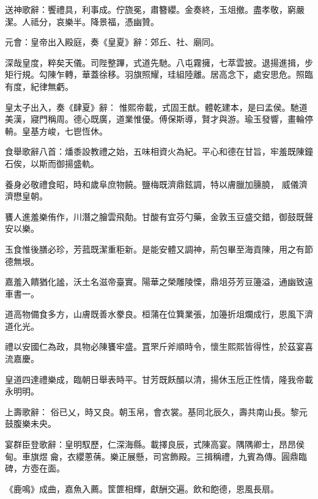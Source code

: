 \begin{pinyinscope}
 送神歌辭：饗禮具，利事成。佇旒冕，肅簪纓。金奏終，玉俎撤。盡孝敬，窮嚴潔。人祗分，哀樂半。降景福，憑幽贊。



 元會：皇帝出入殿庭，奏《皇夏》辭：郊丘、社、廟同。



 深哉皇度，粹矣天儀。司陛整蹕，式道先馳。八屯霧擁，七萃雲披。退揚進揖，步矩行規。勾陳乍轉，華蓋徐移。羽旗照耀，珪組陸離。居高念下，處安思危。照臨有度，紀律無虧。



 皇太子出入，奏《肆夏》辭：
 惟熙帝載，式固王猷。體乾建本，是曰孟侯。馳道美漢，寢門稱周。德心既廣，道業惟優。傅保斯導，賢才與游。瑜玉發響，畫輪停輈。皇基方峻，七鬯恆休。



 食舉歌辭八首：燔黍設教禮之始，五味相資火為紀。平心和德在甘旨，牢羞既陳鐘石俟，以斯而御揚盛軌。



 養身必敬禮食昭，時和歲阜庶物饒。鹽梅既濟鼎鉉調，特以膚臘加臐膮，
 威儀濟濟懋皇朝。



 饔人進羞樂侑作，川潛之膾雲飛勣。甘酸有宜芬勺藥，金敦玉豆盛交錯，御鼓既聲安以樂。



 玉食惟後膳必珍，芳菰既潔重秬新。是能安體又調神，荊包畢至海貢陳，用之有節德無垠。



 嘉羞入饋猶化謐，沃土名滋帝臺實。陽華之榮雕陵慄，鼎俎芬芳豆籩溢，通幽致遠車書一。



 道高物備食多方，山膚既善水豢良。桓蒲在位簨業張，加籩折俎爛成行，恩風下濟道化光。



 禮以安國仁為政，具物必陳饔牢盛。罝罘斤斧順時令，懷生熙熙皆得性，於茲宴喜流嘉慶。



 皇道四達禮樂成，臨朝日舉表時平。甘芳既飫醑以清，揚休玉卮正性情，隆我帝載永明明。



 上壽歌辭：
 俗已乂，時又良。朝玉帛，會衣裳。基同北辰久，壽共南山長。黎元鼓腹樂未央。



 宴群臣登歌辭：皇明馭歷，仁深海縣。載擇良辰，式陳高宴。隅隅卿士，昂昂侯甸。車旗煜龠，衣纓蔥蒨。樂正展懸，司宮飾殿。三揖稱禮，九賓為傳。圓鼎臨碑，方壺在面。



 《鹿鳴》成曲，嘉魚入薦。筐篚相輝，獻酬交遍。飲和飽德，恩風長扇。




\end{pinyinscope}
